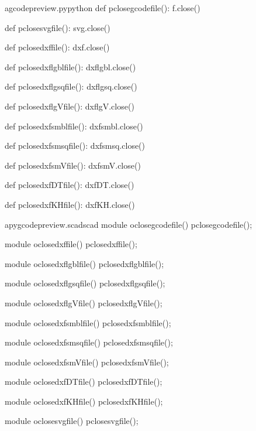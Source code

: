 \documentclass{ltxdoc}
\begin{document}
\lstset{firstnumber=\thegcpy}
\begin{writecode}{a}{gcodepreview.py}{python}
def pclosegcodefile():
    f.close()

def pclosesvgfile():
    svg.close()

def pclosedxffile():
    dxf.close()

def pclosedxflgblfile():
    dxflgbl.close()

def pclosedxflgsqfile():
    dxflgsq.close()

def pclosedxflgVfile():
    dxflgV.close()

def pclosedxfsmblfile():
    dxfsmbl.close()

def pclosedxfsmsqfile():
    dxfsmsq.close()

def pclosedxfsmVfile():
    dxfsmV.close()

def pclosedxfDTfile():
    dxfDT.close()

def pclosedxfKHfile():
    dxfKH.close()

\end{writecode}
\addtocounter{gcpy}{33}
 
\lstset{firstnumber=\thepyscad}
\begin{writecode}{a}{pygcodepreview.scad}{scad}
module oclosegcodefile() {
	pclosegcodefile();
}

module oclosedxffile() {
	pclosedxffile();
}

module oclosedxflgblfile() {
	pclosedxflgblfile();
}

module oclosedxflgsqfile() {
	pclosedxflgsqfile();
}

module oclosedxflgVfile() {
	pclosedxflgVfile();
}

module oclosedxfsmblfile() {
	pclosedxfsmblfile();
}

module oclosedxfsmsqfile() {
	pclosedxfsmsqfile();
}

module oclosedxfsmVfile() {
	pclosedxfsmVfile();
}

module oclosedxfDTfile() {
	pclosedxfDTfile();
}

module oclosedxfKHfile() {
	pclosedxfKHfile();
}

module oclosesvgfile() {
	pclosesvgfile();
}

\end{writecode}
\addtocounter{pyscad}{44}
\end{document}
